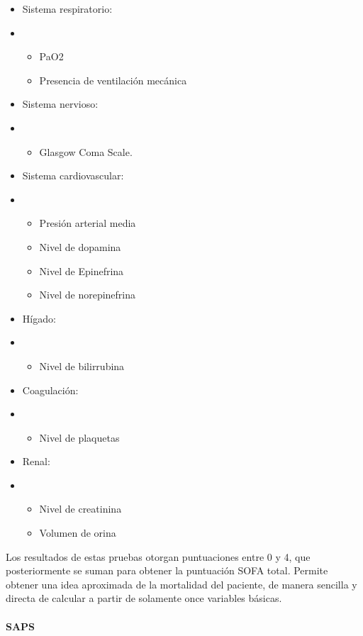 \documentclass{report}
\begin{document}
\begin{itemize}
\item
  Sistema respiratorio:
\item
  \begin{itemize}
  \item
    PaO2
  \item
    Presencia de ventilación mecánica
  \end{itemize}
\item
  Sistema nervioso:
\item
  \begin{itemize}
  \item
    Glasgow Coma Scale. 
  \end{itemize}
\item
  Sistema cardiovascular:
\item
  \begin{itemize}
  \item
    Presión arterial media
  \item
    Nivel de dopamina
  \item
    Nivel de Epinefrina
  \item
    Nivel de norepinefrina
  \end{itemize}
\item
  Hígado:
\item
  \begin{itemize}
  \item
    Nivel de bilirrubina
  \end{itemize}
\item
  Coagulación:
\item
  \begin{itemize}
  \item
    Nivel de plaquetas
  \end{itemize}
\item
  Renal:
\item
  \begin{itemize}
  \item
    Nivel de creatinina
  \item
    Volumen de orina
  \end{itemize}
\end{itemize}

Los resultados de estas pruebas otorgan puntuaciones entre 0 y 4, que
posteriormente se suman para obtener la puntuación SOFA total. Permite
obtener una idea aproximada de la mortalidad del paciente, de manera
sencilla y directa de calcular a partir de solamente once variables
básicas.
\paragraph{SAPS}
\end{document}
